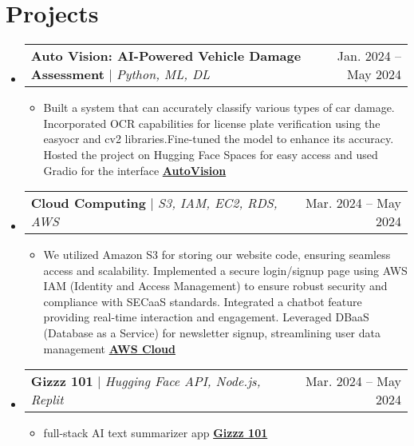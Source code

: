 \documentclass[letterpaper,11pt]{article}
\makeatletter
\newcommand{\resumeItem}[1]{
  \item\small{
    {#1 \vspace{-2pt}}
  }
}
\newcommand{\resumeProjectHeading}[2]{
    \item
    \begin{tabular*}{0.97\textwidth}{l@{\extracolsep{\fill}}r}
      \small#1 & #2 \\
    \end{tabular*}\vspace{-7pt}
}
\newcommand{\resumeSubHeadingListStart}{\begin{itemize}[leftmargin=0.15in, label={}]}
\newcommand{\resumeSubHeadingListEnd}{\end{itemize}}
\newcommand{\resumeItemListStart}{\begin{itemize}}
\newcommand{\resumeItemListEnd}{\end{itemize}\vspace{-5pt}}
\makeatother
\begin{document}
\section{Projects}
  \resumeSubHeadingListStart
    \resumeProjectHeading
      {\textbf{Auto Vision: AI-Powered Vehicle Damage Assessment} $|$ \emph{Python, ML, DL}}{Jan. 2024 -- May 2024}
      \resumeItemListStart
        \resumeItem{Built a system that can accurately classify various types of car damage. Incorporated OCR capabilities for license
plate verification using the easyocr and cv2 libraries.Fine-tuned the model to enhance its accuracy. Hosted the
project on Hugging Face Spaces for easy access and used Gradio for the interface
\href{https://www.linkedin.com/posts/chandanashastri_autovision-ai-machinelearning-activity-7190037479909969921-WMZe?utm_source=share&utm_medium=member_desktop&rcm=ACoAADK9cGQBBQ2ytaQ6riFqnJbrcOA1OnfGoc0}{\textbf{AutoVision}}}
      \resumeItemListEnd
    \resumeProjectHeading
      {\textbf{Cloud Computing} $|$ \emph{S3, IAM, EC2, RDS, AWS }}{Mar. 2024 -- May 2024}
      \resumeItemListStart
        \resumeItem{We utilized Amazon S3 for storing our website code, ensuring seamless access and scalability. Implemented a secure
login/signup page using AWS IAM (Identity and Access Management) to ensure robust security and compliance
with SECaaS standards. Integrated a chatbot feature providing real-time interaction and engagement. Leveraged
DBaaS (Database as a Service) for newsletter signup, streamlining user data management
\href{https://www.linkedin.com/posts/chandanashastri_miniabrproject-s3-iam-activity-7192055727035748352-mi7b?utm_source=share&utm_medium=member_desktop&rcm=ACoAADK9cGQBBQ2ytaQ6riFqnJbrcOA1OnfGoc0}{\textbf{AWS Cloud}}}
    \resumeItemListEnd  

   \resumeProjectHeading
      {\textbf{Gizzz 101} $|$ \emph{Hugging Face API, Node.js, Replit }}{Mar. 2024 -- May 2024}
      \resumeItemListStart
        \resumeItem{full-stack AI text summarizer app \href{https://www.linkedin.com/posts/activity-7122321184368594945-2rVt?utm_source=share&utm_medium=member_desktop&rcm=ACoAADK9cGQBBQ2ytaQ6riFqnJbrcOA1OnfGoc0}{\textbf{Gizzz 101}}}
      \resumeItemListEnd  
  \resumeSubHeadingListEnd

\end{document}
